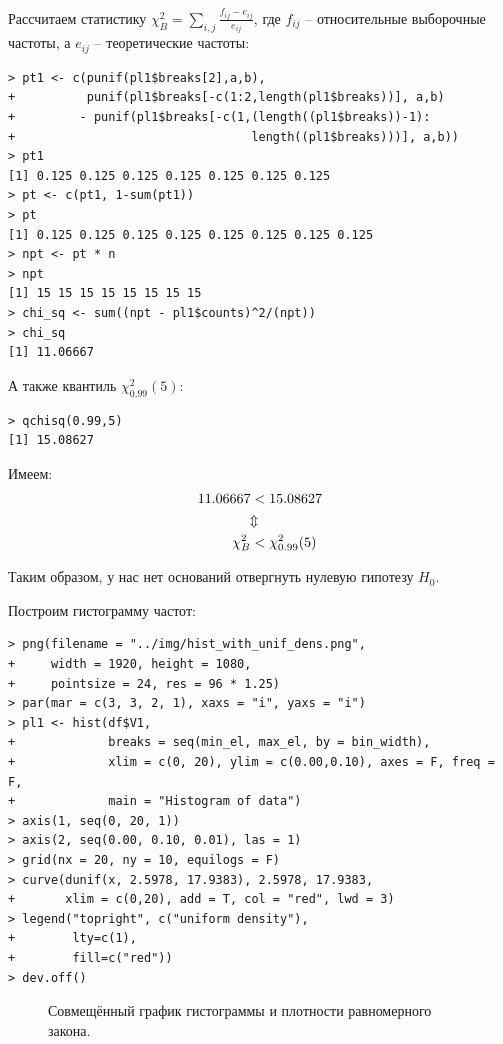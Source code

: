 \documentclass[14pt,a4paper]{scrartcl}
\begin{document}
Рассчитаем статистику $\chi^2_B = \sum\limits_{i,j} \frac{f_{ij} - e_{ij}}{e_{ij}}$, где ${f_{ij}}$ --  относительные выборочные частоты, а ${e_{ij}}$ -- теоретические частоты:

\begin{verbatim}
> pt1 <- c(punif(pl1$breaks[2],a,b),
+          punif(pl1$breaks[-c(1:2,length(pl1$breaks))], a,b)
+         - punif(pl1$breaks[-c(1,(length((pl1$breaks))-1):
+                                 length((pl1$breaks)))], a,b))
> pt1
[1] 0.125 0.125 0.125 0.125 0.125 0.125 0.125
> pt <- c(pt1, 1-sum(pt1))
> pt
[1] 0.125 0.125 0.125 0.125 0.125 0.125 0.125 0.125
> npt <- pt * n
> npt
[1] 15 15 15 15 15 15 15 15
> chi_sq <- sum((npt - pl1$counts)^2/(npt))
> chi_sq
[1] 11.06667
\end{verbatim}

А также квантиль ${\chi^2_{0.99} (5)}$:

\begin{verbatim}
> qchisq(0.99,5)
[1] 15.08627
\end{verbatim}

Имеем:
\begin{align*}
11.06667 &< 15.08627 \\
&\rotatebox[origin=c]{-90}{$\Leftrightarrow$} \notag \\ 
\chi^2_B &< {\chi^2_{0.99} (5)}
\end{align*}


Таким образом, у нас нет оснований отвергнуть нулевую гипотезу $H_0$.


Построим гистограмму частот:
\begin{verbatim}
> png(filename = "../img/hist_with_unif_dens.png", 
+     width = 1920, height = 1080,
+     pointsize = 24, res = 96 * 1.25)
> par(mar = c(3, 3, 2, 1), xaxs = "i", yaxs = "i")
> pl1 <- hist(df$V1,
+             breaks = seq(min_el, max_el, by = bin_width), 
+             xlim = c(0, 20), ylim = c(0.00,0.10), axes = F, freq = F,
+             main = "Histogram of data")
> axis(1, seq(0, 20, 1))
> axis(2, seq(0.00, 0.10, 0.01), las = 1)
> grid(nx = 20, ny = 10, equilogs = F)
> curve(dunif(x, 2.5978, 17.9383), 2.5978, 17.9383, 
+       xlim = c(0,20), add = T, col = "red", lwd = 3)
> legend("topright", c("uniform density"), 
+        lty=c(1), 
+        fill=c("red"))
> dev.off()
\end{verbatim}

\begin{figure}[h]
	\caption{Совмещённый график гистограммы и плотности равномерного закона.}
	\label{ris:hist_with_unif_dens}
\end{figure}
\end{document}
